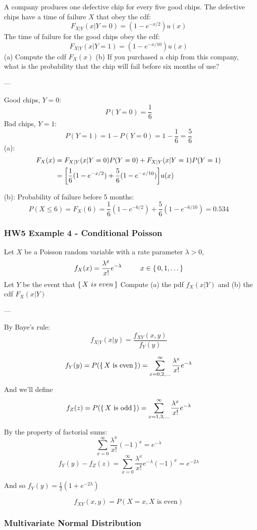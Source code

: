 \documentclass{report}
\DeclarePairedDelimiter\autosquarebracket{[}{]}
\newcommand{\sqbr}[1]{\autosquarebracket*{#1}}
\begin{document}
A company produces one defective chip for every five good chips. The defective chips have a time of failure $X$ that obey the cdf: $$F_{X|Y} (x|Y = 0) = (1-e^{-x/2})u(x)$$ The time of failure for the good chips obey the cdf: $$F_{X|Y} (x|Y = 1) = (1-e^{-x/10})u(x)$$ (a) Compute the cdf $F_X(x)$ (b) If you purchased a chip from this company, what is the probability that the chip will fail before six months of use?

---

Good chips, $Y=0$: $$P(Y=0) = \frac{1}{6}$$
Bad chips, $Y=1$: $$P(Y=1) = 1-P(Y=0) = 1-\frac{1}{6} = \frac{5}{6}$$
(a): \begin{align*}
F_X(x) & = F_{X|Y}(x|Y=0)P(Y=0) + F_{X|Y}(x|Y=1)P(Y=1) \\
& = \sqbr{ \frac{1}{6}(1-e^{-x/2}) + \frac{5}{6}(1-e^{-x/10}) } u(x)
\end{align*}

(b): Probability of failure before 5 months: $$P(X \leq 6) = F_X(6) = \frac{1}{6}(1-e^{-6/2}) + \frac{5}{6}(1-e^{-6/10}) = 0.534 $$

\subsubsection*{HW5 Example 4 - Conditional Poisson}

Let $X$ be a Poisson random variable with a rate parameter $\lambda > 0$, $$f_X(x) = \frac{\lambda^x}{x!}e^{-\lambda}\ \ \ \ \ \ \ \ x \in \set{0, 1, \dots} $$
Let $Y$ be the event that $\set{X\ is\ even}$ Compute (a) the pdf $f_X(x|Y)$ and (b) the cdf $F_X(x|Y)$

---

By Baye's rule: $$f_{X|Y}(x|y) = \frac{f_{XY}(x,y)}{f_Y(y)}$$

$$f_Y(y) = P(\set{X \text{ is even}}) = \sum_{x=0,2,\dots}^{\infty} \frac{\lambda^x}{x!}e^{-\lambda}$$ 

And we'll define $$f_Z(z) = P(\set{X \text{ is odd}}) = \sum_{x=1,3,\dots}^{\infty} \frac{\lambda^x}{x!}e^{-\lambda}$$

By the property of factorial sums: $$\sum_{x=0}^\infty \frac{\lambda^x}{x!}(-1)^x = e^{-\lambda}$$
$$f_Y(y) - f_Z(z) = \sum_{x=0}^{\infty} \frac{\lambda^x}{x!} e^{-\lambda} (-1)^x  =  e^{-2 \lambda}$$

And so $f_Y(y) = \frac{1}{2}(1+e^{-2 \lambda})$

$$f_{XY}(x,y) = P(X=x, X \text{ is even})$$




\subsubsection{Multivariate Normal Distribution}
\end{document}

